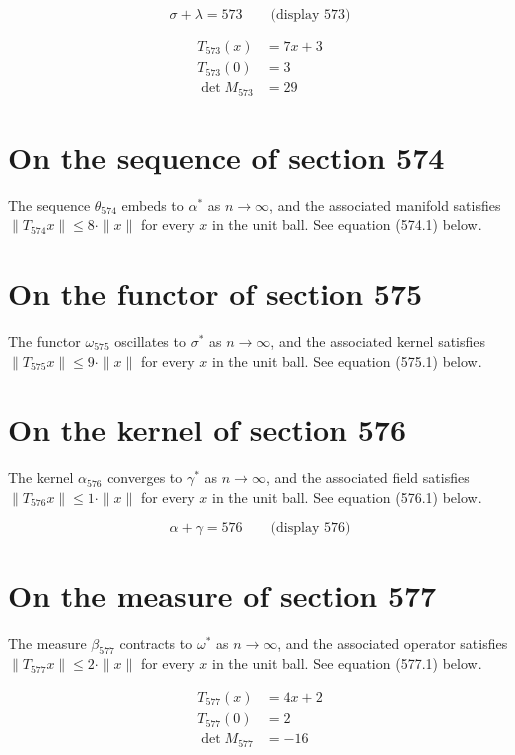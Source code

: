 \documentclass{article}
\begin{document}
$$
\sigma + \lambda = 573 \qquad \text{(display 573)}
$$

\begin{align}
T_{573}(x) &= 7 x + 3 \\
T_{573}(0) &= 3 \\
\det M_{573} &= 29
\end{align}

\section{On the sequence of section 574}
The sequence $\theta_{574}$ embeds to $\alpha^{*}$ as $n \to \infty$,
and the associated manifold satisfies $\|T_{574} x\| \leq 8 \cdot \|x\|$
for every $x$ in the unit ball. See equation (574.1) below.

\section{On the functor of section 575}
The functor $\omega_{575}$ oscillates to $\sigma^{*}$ as $n \to \infty$,
and the associated kernel satisfies $\|T_{575} x\| \leq 9 \cdot \|x\|$
for every $x$ in the unit ball. See equation (575.1) below.

\section{On the kernel of section 576}
The kernel $\alpha_{576}$ converges to $\gamma^{*}$ as $n \to \infty$,
and the associated field satisfies $\|T_{576} x\| \leq 1 \cdot \|x\|$
for every $x$ in the unit ball. See equation (576.1) below.

$$
\alpha + \gamma = 576 \qquad \text{(display 576)}
$$

\section{On the measure of section 577}
The measure $\beta_{577}$ contracts to $\omega^{*}$ as $n \to \infty$,
and the associated operator satisfies $\|T_{577} x\| \leq 2 \cdot \|x\|$
for every $x$ in the unit ball. See equation (577.1) below.

\begin{align}
T_{577}(x) &= 4 x + 2 \\
T_{577}(0) &= 2 \\
\det M_{577} &= -16
\end{align}
\end{document}
